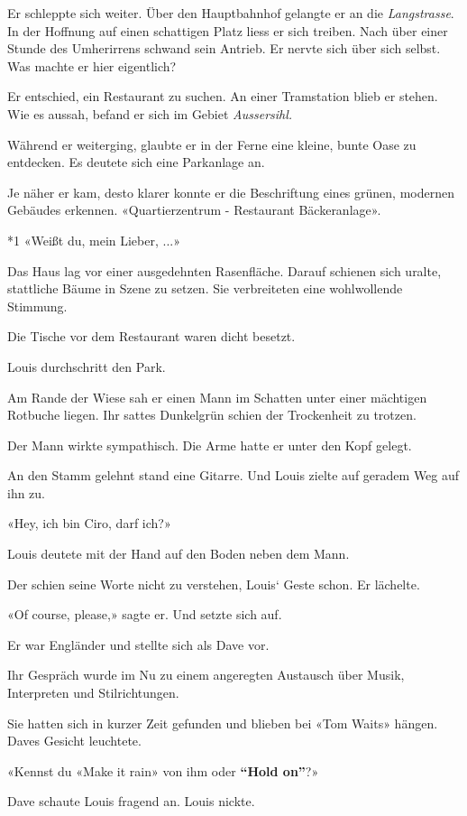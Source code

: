 Er schleppte sich weiter. Über den Hauptbahnhof gelangte er an die
\emph{Langstrasse}. In der Hoffnung auf einen schattigen Platz liess er
sich treiben. Nach über einer Stunde des Umherirrens schwand sein
Antrieb. Er nervte sich über sich selbst. Was machte er hier eigentlich?

Er entschied, ein Restaurant zu suchen. An einer Tramstation blieb er
stehen. Wie es aussah, befand er sich im Gebiet \emph{Aussersihl.}

Während er weiterging, glaubte er in der Ferne eine kleine, bunte Oase
zu entdecken. Es deutete sich eine Parkanlage an.

Je näher er kam, desto klarer konnte er die Beschriftung eines grünen,
modernen Gebäudes erkennen. «Quartierzentrum - Restaurant Bäckeranlage».

*1 «Weißt du, mein Lieber, ...»

Das Haus lag vor einer ausgedehnten Rasenfläche. Darauf schienen sich
uralte, stattliche Bäume in Szene zu setzen. Sie verbreiteten eine
wohlwollende Stimmung.

Die Tische vor dem Restaurant waren dicht besetzt.

Louis durchschritt den Park.

Am Rande der Wiese sah er einen Mann im Schatten unter einer mächtigen
Rotbuche liegen. Ihr sattes Dunkelgrün schien der Trockenheit zu
trotzen.

Der Mann wirkte sympathisch. Die Arme hatte er unter den Kopf gelegt.

An den Stamm gelehnt stand eine Gitarre. Und Louis zielte auf geradem
Weg auf ihn zu.

«Hey, ich bin Ciro, darf ich?»

Louis deutete mit der Hand auf den Boden neben dem Mann.

Der schien seine Worte nicht zu verstehen, Louis` Geste schon. Er
lächelte.

«Of course, please,» sagte er. Und setzte sich auf.

Er war Engländer und stellte sich als Dave vor.

Ihr Gespräch wurde im Nu zu einem angeregten Austausch über Musik,
Interpreten und Stilrichtungen.

Sie hatten sich in kurzer Zeit gefunden und blieben bei «Tom Waits»
hängen. Daves Gesicht leuchtete.

«Kennst du «Make it rain» von ihm oder \textbf{``Hold on''}?»

Dave schaute Louis fragend an. Louis nickte.

